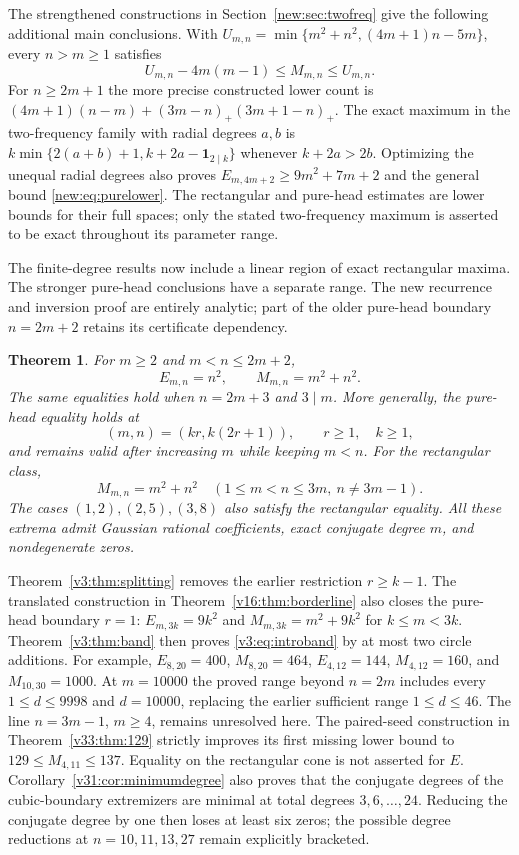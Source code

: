 \documentclass[UTF8,11pt]{ctexart}
\newtheorem{thm}{Theorem}[section]
\theoremstyle{definition}
\numberwithin{equation}{section}
\begin{document}
The strengthened constructions in Section~\ref{new:sec:twofreq} give the
following additional main conclusions. With
$U_{m,n}=\min\{m^2+n^2,(4m+1)n-5m\}$, every $n>m\ge1$ satisfies
\[
 U_{m,n}-4m(m-1)\le M_{m,n}\le U_{m,n}.
\]
For $n\ge2m+1$ the more precise constructed lower count is
$(4m+1)(n-m)+(3m-n)_+(3m+1-n)_+$.
The exact maximum in the two-frequency family with radial degrees $a,b$
is $k\min\{2(a+b)+1,k+2a-\mathbf1_{2\mid k}\}$ whenever $k+2a>2b$.
Optimizing the unequal radial degrees also proves
$E_{m,4m+2}\ge9m^2+7m+2$ and the general bound
\eqref{new:eq:purelower}. The rectangular and pure-head estimates are
lower bounds for their full spaces; only the stated two-frequency
maximum is asserted to be exact throughout its parameter range.

The finite-degree results now include a linear region of exact rectangular
maxima. The stronger pure-head conclusions have a separate range.
The new recurrence and inversion proof are entirely analytic; part of
the older pure-head boundary $n=2m+2$ retains its certificate dependency.
\begin{thm}\label{d:thm:main}
For $m\ge2$ and $m<n\le2m+2$,
\begin{equation}\label{d:eq:main}
 E_{m,n}=n^2,\qquad M_{m,n}=m^2+n^2.
\end{equation}
The same equalities hold when $n=2m+3$ and $3\mid m$.
More generally, the pure-head equality holds at
\[
 (m,n)=(kr,k(2r+1)),\qquad r\ge1,\quad k\ge1,
\]
and remains valid after increasing $m$ while keeping $m<n$.
For the rectangular class,
\begin{equation}\label{v3:eq:introband}
 M_{m,n}=m^2+n^2\quad
 (1\le m<n\le3m,\ n\ne3m-1).
\end{equation}
The cases $(1,2),(2,5),(3,8)$ also satisfy the rectangular equality.
All these extrema admit Gaussian rational coefficients, exact conjugate
degree $m$, and nondegenerate zeros.
\end{thm}

Theorem~\ref{v3:thm:splitting} removes the earlier restriction
$r\ge k-1$. The translated construction in
Theorem~\ref{v16:thm:borderline} also closes the pure-head boundary
$r=1$: $E_{m,3k}=9k^2$ and $M_{m,3k}=m^2+9k^2$
for $k\le m<3k$.
Theorem~\ref{v3:thm:band} then proves \eqref{v3:eq:introband} by at
most two circle additions. For example, $E_{8,20}=400$,
$M_{8,20}=464$, $E_{4,12}=144$, $M_{4,12}=160$, and
$M_{10,30}=1000$.
At $m=10000$ the proved range beyond $n=2m$ includes every
$1\le d\le9998$ and $d=10000$, replacing the earlier sufficient
range $1\le d\le46$. The line $n=3m-1$, $m\ge4$, remains unresolved
here. The paired-seed construction in Theorem~\ref{v33:thm:129}
strictly improves its first missing lower bound to
$129\le M_{4,11}\le137$. Equality on the rectangular cone
is not asserted for $E$.
Corollary~\ref{v31:cor:minimumdegree} also proves that the conjugate
degrees of the cubic-boundary extremizers are minimal at total
degrees $3,6,\ldots,24$. Reducing the conjugate degree by one
then loses at least six zeros; the possible degree reductions at
$n=10,11,13,27$ remain explicitly bracketed.
\end{document}
